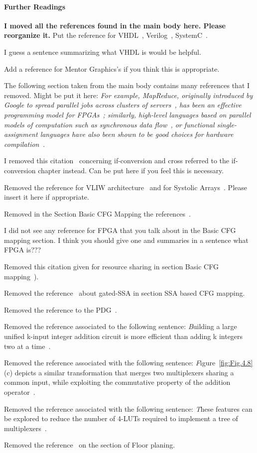 \paragraph{Further Readings}
{\bf I moved all the references found in the main body here. Please reorganize it.}
Put the reference for VHDL~\cite{VHDLBook}, Verilog~\cite{VerilogBook}, SystemC~\cite{SystemC:ISSS01}.

I guess a sentence summarizing what VHDL is would be helpful.

Add a reference for Mentor Graphics's if you think this is appropriate.

The following section taken from the main body contains many references that I removed. Might be put it here: {\em 
For example, MapReduce, originally introduced by Google to spread parallel 
jobs across clusters of servers~\cite{Dean:CACM08}, has been an effective 
programming model for FPGAs~\cite{Yeung:FCCM08}; similarly, high-level 
languages based on parallel models of computation such as synchronous data 
flow~\cite{Lee:ProcIEEE87}, or functional single-assignment languages have 
also been shown to be good choices for hardware 
compilation~\cite{Hormati:CASES08,Hagiescu:DAC09,SAC:IJS02}.}

I removed this citation~\cite{Allen:POPL83} concerning if-conversion and cross referred to the if-conversion chapter instead. Can be put here if you feel this is necessary.

Removed the reference for VLIW architecture~\cite{Fisher:2005:Book} and for Systolic Arrays~\cite{CompilingSystolicArraysBook}. Please insert it here if appropriate.

Removed in the Section Basic CFG Mapping the references~\cite{Hormati:CASES08,Kaplan:DAC03}.

I did not see any reference for FPGA that you talk about in the Basic CFG mapping section. I think you should give one and summaries in a sentence what FPGA is???

Removed this citation given for resource sharing in section Basic CFG mapping~\cite{Memik:DAC03}).

Removed the reference~\cite{Tu-SC95} about gated-SSA in section SSA based CFG mapping.

Removed the reference to the PDG~\cite{Ferrante-TOPLAS87}. 

Removed the reference associated to the following sentence: {\emph Building a large unified k-input integer addition circuit is more
efficient than adding k integers two at a time~\cite{Stelling98,Wallace64}. }

Removed the reference associated with the following sentence: {\emph Figure~\ref{fig:Fig.4.8}(c) depicts a similar transformation that 
merges two multiplexers sharing a common input, while exploiting
the commutative property of the addition operator~\cite{Verma08}.}

Removed the reference associated with the following sentence: {\emph These features can be explored to reduce the number 
of 4-LUTs required to implement a tree of multiplexers~\cite{Nancekievill05}.}

Removed the reference~\cite{Kaplan:DAC03} on the section of Floor planing.
